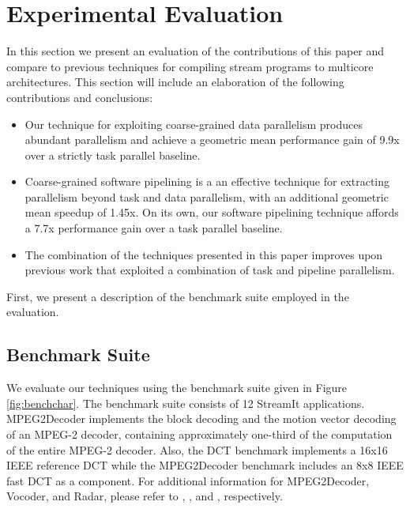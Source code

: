 \section{Experimental Evaluation}

In this section we present an evaluation of the contributions of this
paper and compare to previous techniques for compiling stream programs
to multicore architectures.  This section will include an elaboration
of the following contributions and conclusions:

\begin{itemize}
\item Our technique for exploiting coarse-grained data parallelism
produces abundant parallelism and achieve a geometric mean performance
gain of 9.9x over a strictly task parallel baseline.
\item Coarse-grained software pipelining is a
an effective technique for extracting parallelism beyond task and data
parallelism, with an additional geometric mean speedup of 1.45x. On
its own, our software pipelining technique affords a 7.7x performance
gain over a task parallel baseline.
\item The combination of the techniques presented in this paper
improves upon previous work that exploited a combination of task and
pipeline parallelism.
\end{itemize}

First, we present a description of the benchmark suite employed
in the evaluation.

\begin{figure*}[t]
\centering
{}
\caption{Benchmark characteristics
\protect\label{fig:benchchar}}
\end{figure*}

\subsection{Benchmark Suite}
We evaluate our techniques using the benchmark suite given in Figure
\ref{fig:benchchar}.   The benchmark suite consists of 12 StreamIt
applications. MPEG2Decoder implements the block decoding and the
motion vector decoding of an MPEG-2 decoder, containing approximately
one-third of the computation of the entire MPEG-2 decoder.  Also, the
DCT benchmark implements a 16x16 IEEE reference DCT while the
MPEG2Decoder benchmark includes an 8x8 IEEE fast DCT as a component.
For additional information for MPEG2Decoder, Vocoder, and Radar,
please refer to \cite{ipdps2006},
\cite{seneff80}, and \cite{pca}, respectively. 

